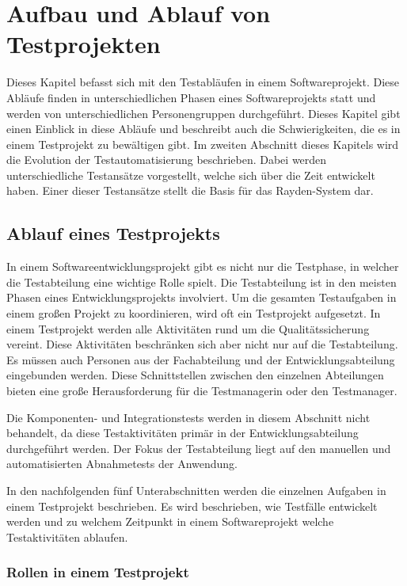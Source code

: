 \chapter{Aufbau und Ablauf von Testprojekten}
\label{cha:Konzept}

Dieses Kapitel befasst sich mit den Testabläufen in einem Softwareprojekt. Diese Abläufe finden in unterschiedlichen Phasen eines Softwareprojekts statt und werden von unterschiedlichen Personengruppen durchgeführt. Dieses Kapitel gibt einen Einblick in diese Abläufe und beschreibt auch die Schwierigkeiten, die es in einem Testprojekt zu bewältigen gibt. Im zweiten Abschnitt dieses Kapitels wird die Evolution der Testautomatisierung beschrieben. Dabei werden unterschiedliche Testansätze vorgestellt, welche sich über die Zeit entwickelt haben. Einer dieser Testansätze stellt die Basis für das Rayden-System dar.

\section{Ablauf eines Testprojekts}

In einem Softwareentwicklungsprojekt gibt es nicht nur die Testphase, in welcher die Testabteilung eine wichtige Rolle spielt. Die Testabteilung ist in den meisten Phasen eines Entwicklungsprojekts involviert. Um die gesamten Testaufgaben in einem großen Projekt zu koordinieren, wird oft ein Testprojekt aufgesetzt. In einem Testprojekt werden alle Aktivitäten rund um die Qualitätssicherung vereint. Diese Aktivitäten beschränken sich aber nicht nur auf die Testabteilung. Es müssen auch Personen aus der Fachabteilung und der Entwicklungsabteilung eingebunden werden. Diese Schnittstellen zwischen den einzelnen Abteilungen bieten eine große Herausforderung für die Testmanagerin oder den Testmanager.

\SuperPar
Die Komponenten- und Integrationstests werden in diesem Abschnitt nicht behandelt, da diese Testaktivitäten primär in der Entwicklungsabteilung durchgeführt werden. Der Fokus der Testabteilung liegt auf den manuellen und automatisierten Abnahmetests der Anwendung.

\SuperPar
In den nachfolgenden fünf Unterabschnitten werden die einzelnen Aufgaben in einem Testprojekt beschrieben. Es wird beschrieben, wie Testfälle entwickelt werden und zu welchem Zeitpunkt in einem Softwareprojekt welche Testaktivitäten ablaufen.

\subsection{Rollen in einem Testprojekt}

